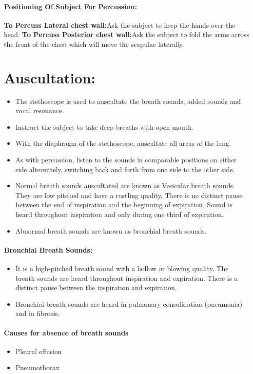 \documentclass[a4paper,12pt,openany,oneside]{book}
\begin{document}
\paragraph{Positioning Of Subject For Percussion:}
\textbf{To Percuss Lateral chest wall:}Ask the subject to keep the hands over the head.
\textbf{To Percuss Posterior chest wall:}Ask the subject to fold the arms across the front of the chest which will move the scapulae laterally.

\section*{Auscultation:}
\begin{itemize}
\item{The  stethoscope  is  used  to  auscultate  the  breath  sounds,  added  sounds  and  vocal resonance.}
\item{Instruct the subject to take deep breaths with open mouth.}
\item{With the diaphragm of the stethoscope, auscultate all areas of the lung.}
\item{As with percussion, listen to the sounds in comparable positions on either side alternately, switching back and forth from one side to the other side.}
\item{Normal breath sounds auscultated are known as Vesicular breath sounds. They are low pitched and have a rustling quality. There is no distinct pause between the end of inspiration and the beginning of expiration. Sound is heard throughout inspiration and only during one third of expiration.}
\item{Abnormal breath sounds are known as bronchial breath sounds.}
\end{itemize}

\paragraph{Bronchial Breath Sounds:}
\begin{itemize}
\item{It is a high-pitched breath sound with a hollow or blowing quality. The breath sounds are heard throughout inspiration and expiration. There is a distinct pause between the inspiration and expiration.}
\item{Bronchial breath sounds are heard in pulmonary consolidation (pneumonia) and in fibrosis.}
\end{itemize}

\paragraph{Causes for absence of breath sounds}
\begin{itemize}
		\itemsep0em
	\item{Pleural effusion}
	\item{Pneumothorax}
\end{itemize}
\end{document}
